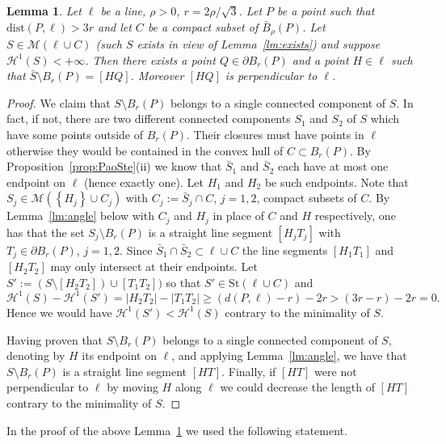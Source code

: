 \documentclass{amsart}
\renewcommand{\H}{\mathcal H}
\newcommand{\abs}[1]{\left\vert #1 \right\vert}
\newcommand{\ENCLOSE}[1]{\left\{#1\right\}}
\newcommand{\St}{\mathrm{St}}
\newcommand{\M}{\mathcal{M}}
\renewcommand{\H}{\mathcal{H}}
\newcommand{\dist}{\mathrm{dist}}
\newtheorem{lemma}[theorem]{Lemma}
\theoremstyle{definition}
\theoremstyle{remark}
\begin{document}
\begin{lemma}\label{lm:base}
  Let $\ell$ be a line, $\rho>0$, 
  $r=2\rho/\sqrt 3$.
  Let $P$ be a point such that $\dist(P,\ell)>3r$
  and let $C$ be a compact subset of $\bar B_\rho(P)$.
  Let $S \in \M(\ell\cup C)$ 
  (such $S$ exists in view of Lemma~\ref{lm:exists})
  and suppose $\H^1(S)<+\infty$.
  Then there exists a point $Q\in \partial B_r(P)$ 
  and a point $H\in \ell$
  such that $\bar S\setminus B_r(P) = [HQ]$.
  Moreover $[HQ]$ is perpendicular to $\ell$.
\end{lemma}
\begin{proof}
  We claim that $S\setminus B_r(P)$ belongs to 
  a single connected component of $S$. 
  In fact, if not, there are two different connected components 
  $S_1$ and $S_2$ of $S$ which have some points outside of 
  $B_r(P)$. 
  Their closures must have points in $\ell$ otherwise 
  they would be contained in the convex hull of $C\subset B_r(P)$.
  By Proposition~\ref{prop:PaoSte}(ii) we know  
  that $\bar S_1$ and $\bar S_2$ each have 
  at most one endpoint on $\ell$ (hence exactly one).
  Let $H_1$ and $H_2$ be such endpoints.
  Note that $S_j\in \M(\ENCLOSE{H_j}\cup C_j)$ 
  with $C_j:=\bar S_j\cap C$, $j=1,2$, compact subsets of $C$. 
  By Lemma~\ref{lm:angle} below
  with $C_j$ and $H_j$ in place of $C$ and $H$ respectively,
  one has that
  the set $S_j\setminus B_r(P)$ is a straight line segment $[H_j T_j]$
  with $T_j\in \partial B_r(P)$, $j=1,2$.
  Since $\bar S_1\cap \bar S_2\subset \ell\cup C$ 
  the line segments $[H_1T_1]$ and $[H_2T_2]$ may only intersect at their endpoints.
  Let $S':=(S\setminus [H_2T_2])\cup[T_1T_2])$ so that 
  $S'\in \St(\ell\cup C)$ and
  \[
    \H^1(S) - \H^1(S')
    = \abs{H_2 T_2} - \abs{T_1T_2}
    \ge (d(P,\ell)-r) - 2r 
    > (3r-r) - 2r = 0. 
  \]
  Hence we would have $\H^1(S')<\H^1(S)$ contrary to the minimality of $S$.

  Having proven that $S\setminus B_r(P)$ belongs to a single 
  connected component of $S$, 
  denoting by $H$ its endpoint on $\ell$,
  and applying Lemma~\ref{lm:angle}, we have that 
  $S\setminus B_r(P)$ is a straight line segment $[HT]$.
  Finally, if $[HT]$ were not perpendicular to $\ell$ by moving $H$ along $\ell$ 
  we could decrease the length of $[HT]$ contrary to the minimality 
  of $S$.
\end{proof}
  
In the proof of the above Lemma~\ref{lm:base} we used the following statement.
\end{document}
